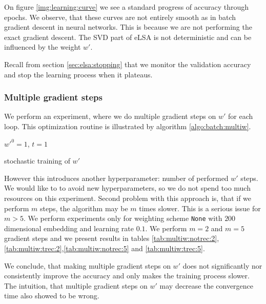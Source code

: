     On figure \ref{img:learning:curve} we see a standard progress of accuracy through epochs. 
    We observe, that these curves are not entirely smooth as in batch gradient descent in neural networks.
    This is because we are not performing the exact gradient descent.
    The SVD part of eLSA is not deterministic and can be influenced by the weight $w'$.
    
    Recall from section \ref{sec:elsa:stopping} that we monitor the validation accuracy and stop the learning process when it plateaus. 

    \subsubsection{Multiple gradient steps}
    
    We perform an experiment, where we do multiple gradient steps on $w'$ for each loop. 
    This optimization routine is illustrated by algorithm \ref{algo:batch:multiw}.
    
    \begin{algorithm}[H]
        $w'^0 = 1$, $t=1$\;
        \caption{stochastic training of $w'$} \label{algo:batch:multiw}
    \end{algorithm}
    
    However this introduces another hyperparameter: number of performed $w'$ steps.
    We would like to to avoid new hyperparameters, so we do not spend too much resources on this experiment.
    Second problem with this approach is, that if we perform $m$ steps, the algorithm may be $m$ times slower. 
    This is a serious issue for $m>5$. 
    We perform experiments only for weighting scheme \texttt{None} with $200$ dimensional embedding and learning rate $0.1$.
    We perform $m=2$ and $m=5$ gradient steps and we present results in tables \ref{tab:multiw:notrec:2},
    \ref{tab:multiw:trec:2},\ref{tab:multiw:notrec:5} and \ref{tab:multiw:trec:5}.
    
    

    We conclude, that making multiple gradient steps on $w'$ does not significantly nor consistently improve the accuracy and only makes the training process slower.
    The intuition, that multiple gradient steps on $w'$ may decrease the convergence time also showed to be wrong.


